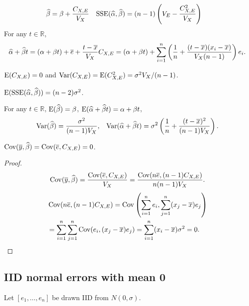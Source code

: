 \documentclass[a4paper, 12pt, fleqn]{article}
\DeclareMathOperator*{\Cov}{Cov}
\newcommand*{\SSE}{\mathrm{SSE}}
\begin{document}
\begin{lemma}
\begin{align*}
\betahat &= \beta + \frac{C_{X,E}}{V_X}
& \SSE(\alphahat, \betahat) &= (n-1)\left(V_E - \frac{C_{X,E}^2}{V_X}\right)
\end{align*}
For any $t \in \mathbb{R}$,
\[ \widehat{\alpha} + \widehat{\beta} t = (\alpha + \beta t) + \overline{e} + \frac{t-\overline{x}}{V_X}C_{X,E}
 = (\alpha + \beta t) + \sum_{i=1}^n \left(\frac{1}{n} + \frac{(t-\overline{x})(x_i-\overline{x})}{V_X(n-1)}\right)e_i. \]
\end{lemma}

\begin{lemma}
$\operatorname*{E}(C_{X,E}) = 0$ and $\operatorname*{Var}(C_{X,E}) = \operatorname*{E}(C_{X,E}^2) = \sigma^2V_X/(n-1)$.
\end{lemma}

\begin{lemma}
$\E(\SSE(\alphahat, \betahat)) = (n-2)\sigma^2$.
\end{lemma}

\begin{lemma}
For any $t \in \mathbb{R}$,
$\operatorname*{E}(\widehat{\beta}) = \beta$, $\operatorname*{E}(\widehat{\alpha} + \widehat{\beta} t) = \alpha + \beta t$,
\begin{align*}
\operatorname*{Var}(\widehat{\beta}) &= \frac{\sigma^2}{(n-1)V_X},
& \operatorname*{Var}(\widehat{\alpha} + \widehat{\beta} t) = \sigma^2\left(\frac{1}{n} + \frac{(t-\overline{x})^2}{(n-1)V_X}\right).
\end{align*}
\end{lemma}

\begin{lemma}
$\Cov(\ybar, \betahat) = \Cov(\ebar, C_{X,E}) = 0$.
\end{lemma}
\begin{proof}
\[ \Cov(\ybar, \betahat) = \frac{\Cov(\ebar, C_{X,E})}{V_X}
    = \frac{\Cov(n\ebar, (n-1)C_{X,E})}{n(n-1)V_X}. \]
\begin{align*}
& \Cov(n\ebar, (n-1)C_{X,E}) = \Cov\left(\sum_{i=1}^n e_i, \sum_{j=1}^n (x_j-\xbar)e_j\right)
\\ &= \sum_{i=1}^n \sum_{j=1}^n \Cov(e_i, (x_j-\xbar)e_j) = \sum_{i=1}^n (x_i-\xbar)\sigma^2 = 0.
\qedhere
\end{align*}
\end{proof}

\subsection{IID normal errors with mean 0}

Let $[e_1, \ldots, e_n]$ be drawn IID from $N(0, \sigma)$.
\end{document}
